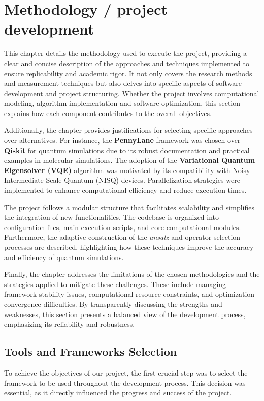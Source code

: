 

\chapter{Methodology / project development}

This chapter details the methodology used to execute the project, providing a clear and concise description of the approaches and techniques implemented to ensure replicability and academic rigor. It not only covers the research methods and measurement techniques but also delves into specific aspects of software development and project structuring. Whether the project involves computational modeling, algorithm implementation and software optimization, this section explains how each component contributes to the overall objectives.

Additionally, the chapter provides justifications for selecting specific approaches over alternatives. For instance, the \textbf{PennyLane} framework was chosen over \textbf{Qiskit} for quantum simulations due to its robust documentation and practical examples in molecular simulations. The adoption of the \textbf{Variational Quantum Eigensolver (VQE)} algorithm was motivated by its compatibility with Noisy Intermediate-Scale Quantum (NISQ) devices. Parallelization strategies were implemented to enhance computational efficiency and reduce execution times.

The project follows a modular structure that facilitates scalability and simplifies the integration of new functionalities. The codebase is organized into configuration files, main execution scripts, and core computational modules. Furthermore, the adaptive construction of the \textit{ansatz} and operator selection processes are described, highlighting how these techniques improve the accuracy and efficiency of quantum simulations.

Finally, the chapter addresses the limitations of the chosen methodologies and the strategies applied to mitigate these challenges. These include managing framework stability issues, computational resource constraints, and optimization convergence difficulties. By transparently discussing the strengths and weaknesses, this section presents a balanced view of the development process, emphasizing its reliability and robustness.

\section{Tools and Frameworks Selection}
To achieve the objectives of our project, the first crucial step was to select the framework to be used throughout the development process. This decision was essential, as it directly influenced the progress and success of the project.

